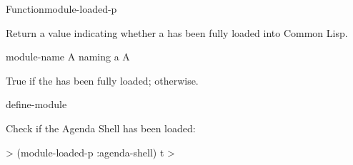 \documentclass[10pt,twoside,english,pdftex]{article}
\begin{document}
\begin{functiondoc}{Function}{module-loaded-p}{
    \returns{} }
%
%

\fnsyntax 

\fnpurpose Return a value indicating whether a  has been fully
loaded into Common Lisp.

\fnpackage {}

\fnmodule {}

\fnargs
\begin{args}{module-name}
 A  naming a 
\arg[boolean] A 
\end{args}

\fnreturns True if the  has been fully loaded; \nil{} otherwise.

\fnerrors
\modulenotdefined

\begin{alsos}{define-module}
\end{alsos}

\fnexample
Check if the Agenda Shell  has been loaded:
%
\begin{example}
\W\supp
  > (module-loaded-p :agenda-shell)
  t
  >
\end{example} 

\end{functiondoc}

\end{document}
